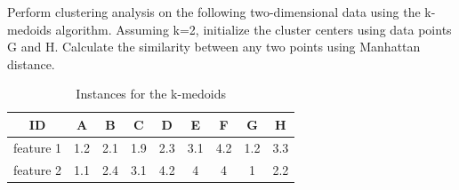 \documentclass[12pt,letterpaper, onecolumn]{exam}
\begin{document}
\begin{questions}
    
    
    \begin{solution}
        \begin{parts}
            \part 
           
        \end{parts}
    \end{solution}

    \newpage

    \question Perform clustering analysis on the following two-dimensional data using the k-medoids algorithm. Assuming k=2, initialize the cluster centers using data points G and H. Calculate the similarity between any two points using Manhattan distance.

    \begin{table}[!h]
        \centering
        \begin{tabular}{c|cccccccc}
            \toprule[2pt]
             ID       & A & B & C & D & E & F & G & H \\
             \midrule
             feature 1& 1.2 & 2.1 & 1.9 & 2.3 & 3.1 & 4.2 & 1.2 & 3.3 \\
             feature 2& 1.1 & 2.4 & 3.1 & 4.2 & 4 & 4 & 1 & 2.2 \\
             \bottomrule[2pt]
        \end{tabular}
        \caption{Instances for the k-medoids}
        \label{tab:cluster}
    \end{table}
    


    \begin{solution}
        \begin{parts}
            \part 
            
        \end{parts} 
    \end{solution}

    
\end{questions}
\end{document}
